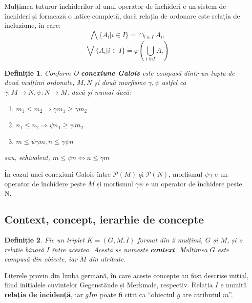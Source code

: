 \documentclass[12pt, a4paper, twoside, romanian]{teza-upb}
\newtheorem{defn}{Definiție}
\begin{document}
    \cite{Carpineto:2004:CDA:975252} Mulțimea tuturor închiderilor al unui operator de închideri e un sistem de închideri și formează o latice completă, dacă relația de ordonare este relația de incluziune, în care:
    $$
    \bigwedge\{A_i | i \in I \} = \cap_{i \in I} A_i,
    $$
    $$
    \bigvee \{A_i | i \in I \} = \varphi\left( \bigcup_{i \ in I} A_i \right)
    $$

    \begin{defn}
      Conform \cite{Carpineto:2004:CDA:975252} O \textbf{conexiune Galois} este compusă dintr-un tuplu de două mulțimi ordonate, $M, N$ și două morfisme $\gamma, \psi$ astfel ca $ \gamma: M \rightarrow N, \psi : N \rightarrow M$, dacă și numai dacă:
    \begin{enumerate}
      \item $m_1 \le m_2 \Rightarrow  \gamma m_1 \ge \gamma m_2$
      \item $n_1 \le n_2 \Rightarrow \psi n_1 \ge \psi m_2$
      \item $m \le \psi \gamma m,  n \le \gamma\psi n $
    \end{enumerate}
    sau, echivalent, $m \le \psi n \Leftrightarrow n \le \gamma m$
    \end{defn}

    În cazul unei conexiuni Galois între $\mathcal{P}(M)$ și $\mathcal{P}(N)$, morfismul $\psi\gamma$ e un operator de închidere peste $M$ și morfismul $\gamma\psi$ e un operator de închidere peste N.

    \subsection{Context, concept, ierarhie de concepte}
    \begin{defn}
      Fie un triplet $K = (G, M, I)$ format din 2 mulțimi, $G$ și $M$, și o relație binară $I$ între acestea. Acesta se numește \textbf{context}. Mulțimea $G$ este compusă din obiecte, iar $M$ din atribute.
    \end{defn}

      Literele provin din limba germană, în care aceste concepte au fost descrise inițial, fiind inițialele cuvintelor Gegenstände și Merkmale, respectiv. Relația $I$ e numită \textbf{relația de incidență}, iar $gIm$ poate fi citit  ca ``obiectul $g$ are atributul $m$''.
\end{document}
